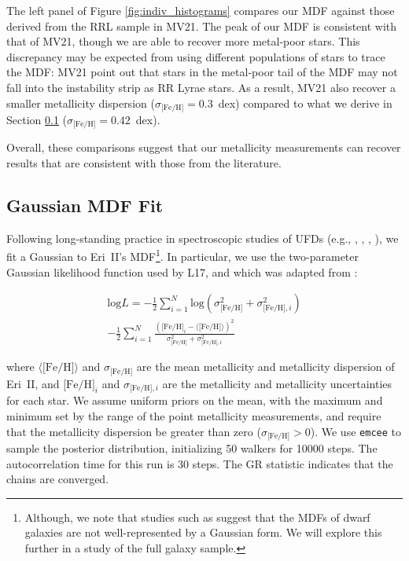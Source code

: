 \documentclass[twocolumn]{aastex63}
\newcommand{\metdisp}     {0.42} %
\begin{document}
\par The left panel of Figure \ref{fig:indiv_histograms} compares our MDF against those derived from the RRL sample in MV21. The peak of our MDF is consistent with that of MV21, though we are able to recover more metal-poor stars. This discrepancy may be expected from using different populations of stars to trace the MDF: MV21 point out that stars in the metal-poor tail of the MDF may not fall into the instability strip as RR Lyrae stars. As a result, MV21 also recover a smaller metallicity dispersion ($\sigma_{\mbox{[Fe/H]}}=0.3$~dex) compared to what we derive in Section \ref{sec:resultsgauss} ($\sigma_{\mbox{[Fe/H]}}=\metdisp$~dex).

\par Overall, these comparisons suggest that our metallicity measurements can recover results that are consistent with those from the literature.

\subsection{Gaussian MDF Fit}
\label{sec:resultsgauss}

\par Following long-standing practice in spectroscopic studies of UFDs (e.g., \citealt{simon2020ufds}, \citealt{li2018carinas}, \citealt{kirby2015ufdspectra}, \citealt{willman2012galaxydefined}), we fit a Gaussian to Eri~II's MDF\footnote{Although, we note that studies such as \citet{leaman2012nongauss} suggest that the MDFs of dwarf galaxies are not well-represented by a Gaussian form. We will explore this further in a study of the full galaxy sample.}. In particular, we use the two-parameter Gaussian likelihood function used by L17, and which was adapted from \citet{walker2006}:

\begin{eqnarray}
\mbox{log}L = -\frac{1}{2} \sum^{N}_{i=1}\mbox{log}(\sigma^2_{\mbox{[Fe/H]}} +\sigma^2_{\mbox{[Fe/H]},i}) \nonumber \\ - \frac{1}{2}\sum^{N}_{i=1}\frac{(\mbox{[Fe/H]}_i - \langle \mbox{[Fe/H]} \rangle)^2}{\sigma^2_{\mbox{[Fe/H]}} +\sigma^2_{\mbox{[Fe/H]},i}}
\end{eqnarray}

\par where $\langle \mbox{[Fe/H]} \rangle$ and $\sigma_{\mbox{[Fe/H]}}$ are the mean metallicity and metallicity dispersion of Eri~II, and $\mbox{[Fe/H]}_i$ and $\sigma_{\mbox{[Fe/H]},i}$ are the metallicity and metallicity uncertainties for each star. We assume uniform priors on the mean, with the maximum and minimum set by the range of the point metallicity measurements, and require that the metallicity dispersion be greater than zero ($\sigma_{\mbox{[Fe/H]}} > 0$). We use \texttt{emcee} to sample the posterior distribution, initializing 50 walkers for 10000 steps. The autocorrelation time for this run is 30 steps. The GR statistic indicates that the chains are converged.
\end{document}
